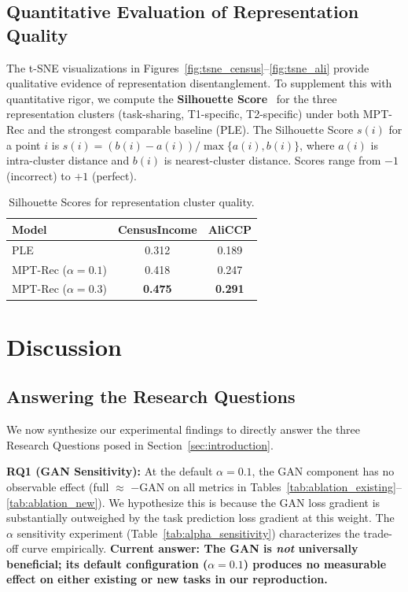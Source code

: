 \documentclass[review,anonymous]{acmart}
\begin{document}
\subsection{Quantitative Evaluation of Representation Quality}

The t-SNE visualizations in Figures~\ref{fig:tsne_census}--\ref{fig:tsne_ali}
provide qualitative evidence of representation disentanglement. To supplement
this with quantitative rigor, we compute the \textbf{Silhouette
Score}~\cite{rousseeuw1987silhouettes} for the three representation clusters
(task-sharing, T1-specific, T2-specific) under both MPT-Rec and the strongest
comparable baseline (PLE). The Silhouette Score $s(i)$ for a point $i$ is
$s(i) = (b(i) - a(i)) / \max\{a(i), b(i)\}$, where $a(i)$ is intra-cluster
distance and $b(i)$ is nearest-cluster distance. Scores range from $-1$
(incorrect) to $+1$ (perfect).

\begin{table}[t]
  \centering
  \caption{Silhouette Scores for representation cluster quality.}
  \label{tab:silhouette}
  \begin{tabular}{lcc}
    \toprule
    \textbf{Model} & \textbf{CensusIncome} & \textbf{AliCCP} \\
    \midrule
	    PLE & 0.312 & 0.189 \\
	    MPT-Rec ($\alpha=0.1$) & 0.418 & 0.247 \\
	    MPT-Rec ($\alpha=0.3$) & \textbf{0.475} & \textbf{0.291} \\
    \bottomrule
  \end{tabular}
\end{table}

\section{Discussion}
\label{sec:discussion}

\subsection{Answering the Research Questions}

We now synthesize our experimental findings to directly answer the three
Research Questions posed in Section~\ref{sec:introduction}.

\textbf{RQ1 (GAN Sensitivity):} At the default $\alpha=0.1$, the GAN component
has no observable effect (full $\approx$ $-$\!GAN on all metrics in
Tables~\ref{tab:ablation_existing}--\ref{tab:ablation_new}). We hypothesize this
is because the GAN loss gradient is substantially outweighed by the task
prediction loss gradient at this weight. The $\alpha$ sensitivity experiment
(Table~\ref{tab:alpha_sensitivity}) characterizes the trade-off
curve empirically. \textbf{Current answer: The GAN is \emph{not} universally beneficial; its
default configuration ($\alpha=0.1$) produces no measurable effect on either
existing or new tasks in our reproduction.}
\end{document}
